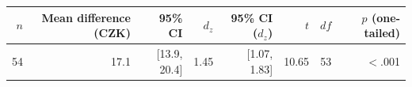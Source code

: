 \begin{tabular}{rrrrrrrr}
\toprule
$n$ & Mean difference (CZK) & 95\% CI & $d_z$ & 95\% CI ($d_z$) & $t$ & $df$ & $p$ (one-tailed) \\
\midrule
54 & 17.1 & [13.9, 20.4] & 1.45 & [1.07, 1.83] & 10.65 & 53 & $<$.001 \\
\bottomrule
\end{tabular}
